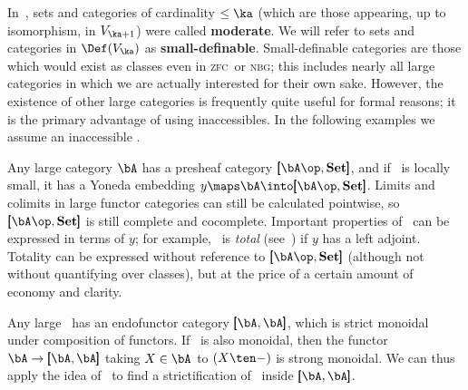 \documentclass[12pt]{amsart}
\newcommand{\Set}{\ensuremath{\mathbf{Set}}}
\def\zfc{\textsc{zfc}}
\def\nbg{\textsc{nbg}}
\begin{document}
In~\cite{street:topos}, sets and categories of cardinality $\le \ka$
(which are those appearing, up to isomorphism, in $V_{\ka+1}$) were
called \textbf{moderate}.  We will refer to sets and categories in
$\Def(V_{\ka})$ as \textbf{small-definable}.  Small-definable
categories are those which would exist as classes even in \zfc\ or \nbg;
this includes nearly all large categories in which we are actually
interested for their own sake.  However, the existence of other large
categories is frequently quite useful for formal reasons; it is the
primary advantage of using inaccessibles.  In the following examples
we assume an inaccessible \ka.

\begin{eg}
  Any large category $\bA$ has a presheaf category
  $\pmb[{\bA\op},\Set\pmb]$, and if \bA\ is locally small, it has a
  Yoneda embedding $y\maps \bA\into \pmb[{\bA\op},\Set\pmb]$.  Limits
  and colimits in large functor categories can still be calculated
  pointwise, so $\pmb[{\bA\op},\Set\pmb]$ is still complete and
  cocomplete.  Important properties of \bA\ can be expressed in terms
  of $y$; for example, \bA\ is \emph{total}
  (see~\cite{kelly:totality}) if $y$ has a left adjoint.  Totality can
  be expressed without reference to $\pmb[{\bA\op},\Set\pmb]$
  (although not without quantifying over classes), but at the price of
  a certain amount of economy and clarity.
\end{eg}

\begin{eg}
  Any large \bA\ has an endofunctor category $\pmb[\bA,\bA\pmb]$,
  which is strict monoidal under composition of functors.  If \bA\ is
  also monoidal, then the functor $\bA\to \pmb[\bA,\bA\pmb]$ taking
  $X\in\bA$ to $(X\ten -)$ is strong monoidal.  We can thus apply the
  idea of~\cite[XI.3 Ex.~3]{maclane} to find a strictification of \bA\
  inside $\pmb[\bA,\bA\pmb]$.
\end{eg}

\end{document}
